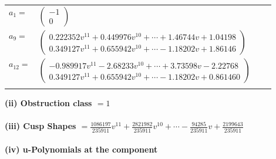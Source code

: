 \documentclass[1p]{elsarticle_modified}
\theoremstyle{definition}
\begin{document}
\begin{tabular}{m{7pt} m{180pt} m{7pt} m{180pt} }
\flushright $a_{1}=$&$\begin{pmatrix}-1\\0\end{pmatrix}$ \\
\flushright $a_{9}=$&$\begin{pmatrix}0.222352 v^{11}+0.449976 v^{10}+\cdots+1.46744 v+1.04198\\0.349127 v^{11}+0.655942 v^{10}+\cdots-1.18202 v+1.86146\end{pmatrix}$ \\
\flushright $a_{12}=$&$\begin{pmatrix}-0.989917 v^{11}-2.68233 v^{10}+\cdots+3.73598 v-2.22768\\0.349127 v^{11}+0.655942 v^{10}+\cdots-1.18202 v+0.861460\end{pmatrix}$\\&\end{tabular}
\flushleft \textbf{(ii) Obstruction class $= 1$}\\~\\
\flushleft \textbf{(iii) Cusp Shapes $= \frac{1086197}{235911} v^{11}+\frac{2821982}{235911} v^{10}+\cdots-\frac{94285}{235911} v+\frac{2199643}{235911}$}\\~\\
\newpage\renewcommand{\arraystretch}{1}
\flushleft \textbf{(iv) u-Polynomials at the component}\newline \\
\end{document}
